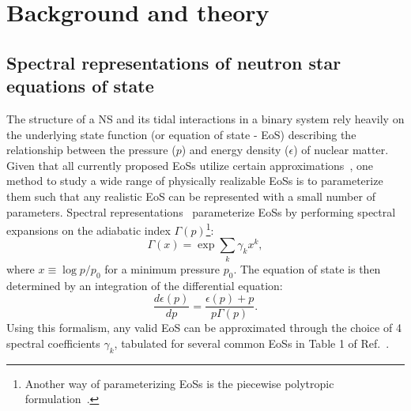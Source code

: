 \documentclass[prd,twocolumn,nofootinbib,superscriptaddress,amsmath,amssymb]{revtex4-1}
\begin{document}

\section{Background and theory}\label{sec:theory}

\subsection{Spectral representations of neutron star equations of state}\label{sec:eos}
The structure of a NS and its tidal interactions in a binary system rely heavily on the underlying state function (or equation of state - EoS) describing the relationship between the pressure ($p$) and energy density ($\epsilon$) of nuclear matter.
Given that all currently proposed EoSs utilize certain approximations~\cite{Oertel:Review,Baym:Review}, one method to study a wide range of physically realizable EoSs is to parameterize them such that any realistic EoS can be represented with a small number of parameters.
Spectral representations~\cite{Lindblom:2010bb,Lindblom:2012zi,Lindblom:2013kra,Lindblom:2018rfr,Abbott:2018exr} parameterize EoSs by performing spectral expansions on the adiabatic index $\Gamma(p)$\footnote{Another way of parameterizing EoSs is the piecewise polytropic formulation~\cite{Read2009,Lackey:2014fwa,Carney:2018sdv}.}:
\begin{equation}
\Gamma(x) = \exp{\sum_k\gamma_k x^k},
\end{equation}
where $x \equiv \log{p/p_0}$ for a minimum pressure $p_0$.
The equation of state is then determined by an integration of the differential equation:
\begin{equation}
\frac{d \epsilon(p)}{dp}=\frac{\epsilon(p)+p}{p \Gamma(p)}.
\end{equation}
Using this formalism, any valid EoS can be approximated through the choice of 4 spectral coefficients $\gamma_k$, tabulated for several common EoSs in Table 1 of Ref.~\cite{Lindblom:2018rfr}.
\end{document}
